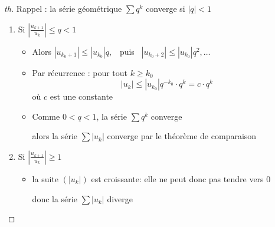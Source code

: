 \begin{frame}
\begin{proof}[th]
Rappel : la série géométrique $\sum q^k$ converge si $|q|<1$

\begin{enumerate}
\item\pause Si $\left|\frac{u_{k+1}}{u_k}\right| \le q< 1$

\begin{itemize}
\item\pause Alors $|u_{k_0+1}| \le |u_{k_0}| q,$ \pause \  puis \  $|u_{k_0+2}| \le |u_{k_0}| q^2, \ldots$ 
\item\pause Par récurrence : pour tout $k\ge k_0$ 
$$|u_k| \le |u_{k_0}| q^{-k_0} \cdot q^k = c \cdot q^k$$
où $c$ est une constante
\item\pause Comme $0 < q < 1$, la série $\sum q^k$ converge

\pause
alors la série $\sum |u_k|$ converge par le théorème de comparaison
\end{itemize}

\item\pause Si $\left|\frac{u_{k+1}}{u_k}\right| \ge 1$
\begin{itemize}
\item\pause la suite $(|u_k|)$ est croissante\pause : elle ne
peut donc pas tendre vers $0$

\pause
donc la série $\sum |u_k|$ diverge
\end{itemize}  
\end{enumerate}
\end{proof}
\end{frame}

